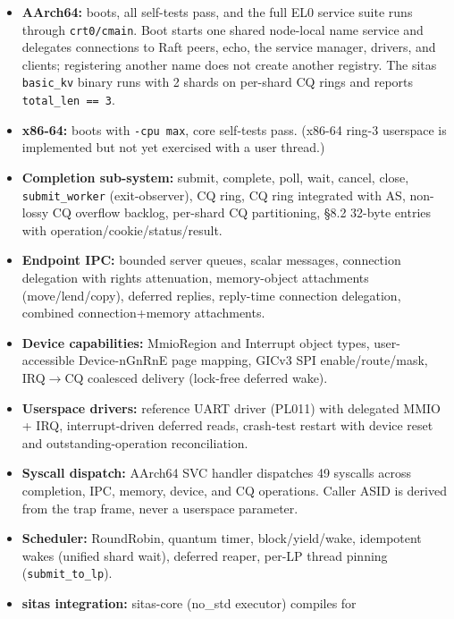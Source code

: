 \begin{itemize}
    \item \textbf{AArch64:} boots, all self-tests pass, and the full EL0 service
        suite runs through \texttt{crt0/cmain}. Boot starts one shared
        node-local name service and delegates connections to Raft peers, echo,
        the service manager, drivers, and clients; registering another name
        does not create another registry. The sitas \texttt{basic\_kv} binary
        runs with 2 shards on per-shard CQ rings and reports
        \texttt{total\_len == 3}.
    \item \textbf{x86-64:} boots with \texttt{-cpu max}, core self-tests pass.
        (x86-64 ring-3 userspace is implemented but not yet exercised with a
        user thread.)
    \item \textbf{Completion sub-system:} submit, complete, poll, wait, cancel,
        close, \texttt{submit\_worker} (exit-observer), CQ ring, CQ ring
        integrated with AS, non-lossy CQ overflow backlog, per-shard CQ
        partitioning, \S8.2 32-byte entries with operation/cookie/status/result.
    \item \textbf{Endpoint IPC:} bounded server queues, scalar messages,
        connection delegation with rights attenuation, memory-object attachments
        (move/lend/copy), deferred replies, reply-time connection delegation,
        combined connection+memory attachments.
    \item \textbf{Device capabilities:} MmioRegion and Interrupt object types,
        user-accessible Device-nGnRnE page mapping, GICv3 SPI enable/route/mask,
        IRQ$\rightarrow$CQ coalesced delivery (lock-free deferred wake).
    \item \textbf{Userspace drivers:} reference UART driver (PL011) with
        delegated MMIO + IRQ, interrupt-driven deferred reads, crash-test
        restart with device reset and outstanding-operation reconciliation.
    \item \textbf{Syscall dispatch:} AArch64 SVC handler dispatches 49 syscalls
        across completion, IPC, memory, device, and CQ operations. Caller ASID
        is derived from the trap frame, never a userspace parameter.
    \item \textbf{Scheduler:} RoundRobin, quantum timer, block/yield/wake,
        idempotent wakes (unified shard wait), deferred reaper, per-LP thread
        pinning (\texttt{submit\_to\_lp}).
    \item \textbf{sitas integration:} sitas-core (no\_std executor) compiles for

\end{itemize}
